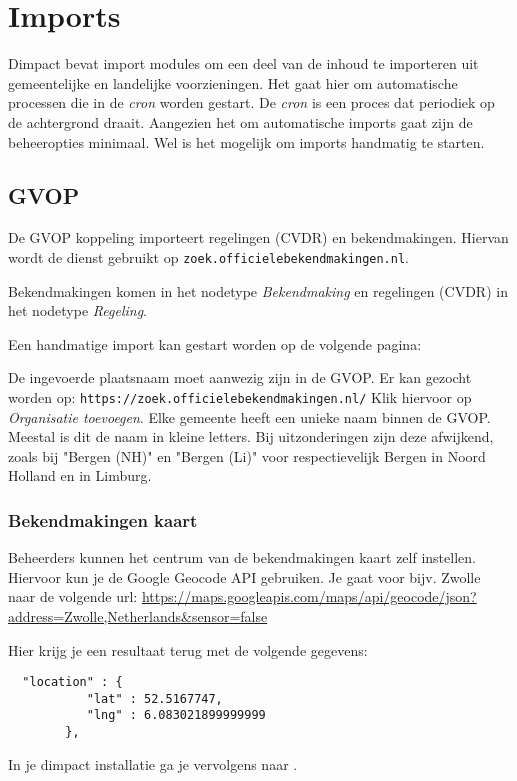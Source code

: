 \section{Imports}

Dimpact bevat import modules om een deel van de inhoud te importeren uit gemeentelijke en landelijke voorzieningen. Het gaat hier om automatische processen die in de \emph{cron} worden gestart. De \emph{cron} is een proces dat periodiek op de achtergrond draait. Aangezien het om automatische imports gaat zijn de beheeropties minimaal. Wel is het mogelijk om imports handmatig te starten.

\subsection{GVOP}

De GVOP koppeling importeert regelingen (CVDR) en bekendmakingen. Hiervan wordt de dienst gebruikt op \texttt{zoek.officielebekendmakingen.nl}.

Bekendmakingen komen in het nodetype \emph{Bekendmaking} en regelingen (CVDR) in het nodetype \emph{Regeling}.

Een handmatige import kan gestart worden op de volgende pagina: \\

De ingevoerde plaatsnaam moet aanwezig zijn in de GVOP. Er kan gezocht worden op:
\texttt{https://zoek.officielebekendmakingen.nl/}
Klik hiervoor op \emph{Organisatie toevoegen}.
Elke gemeente heeft een unieke naam binnen de GVOP. Meestal is dit de naam in kleine letters. Bij uitzonderingen zijn deze afwijkend, zoals bij "Bergen (NH)" en "Bergen (Li)" voor respectievelijk Bergen in Noord Holland en in Limburg.

\subsubsection{Bekendmakingen kaart}

Beheerders kunnen het centrum van de bekendmakingen kaart zelf instellen. Hiervoor kun je de Google Geocode API gebruiken. Je gaat voor bijv. Zwolle naar de volgende url:
\url{https://maps.googleapis.com/maps/api/geocode/json?address=Zwolle,Netherlands&sensor=false}

Hier krijg je een resultaat terug met de volgende gegevens:

\begin{verbatim}
  "location" : {
           "lat" : 52.5167747,
           "lng" : 6.083021899999999
        },
\end{verbatim}
In je dimpact installatie ga je vervolgens naar .


